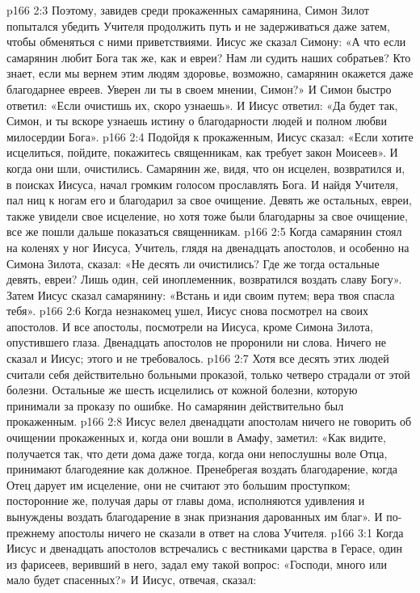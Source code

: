 \vs p166 2:3 Поэтому, завидев среди прокаженных самарянина, Симон Зилот попытался убедить Учителя продолжить путь и не задерживаться даже затем, чтобы обменяться с ними приветствиями. Иисус же сказал Симону: «А что если самарянин любит Бога так же, как и евреи? Нам ли судить наших собратьев? Кто знает, если мы вернем этим людям здоровье, возможно, самарянин окажется даже благодарнее евреев. Уверен ли ты в своем мнении, Симон?» И Симон быстро ответил: «Если очистишь их, скоро узнаешь». И Иисус ответил: «Да будет так, Симон, и ты вскоре узнаешь истину о благодарности людей и полном любви милосердии Бога».
\vs p166 2:4 Подойдя к прокаженным, Иисус сказал: «Если хотите исцелиться, пойдите, покажитесь священникам, как требует закон Моисеев». И когда они шли, очистились. Самарянин же, видя, что он исцелен, возвратился и, в поисках Иисуса, начал громким голосом прославлять Бога. И найдя Учителя, пал ниц к ногам его и благодарил за свое очищение. Девять же остальных, евреи, также увидели свое исцеление, но хотя тоже были благодарны за свое очищение, все же пошли дальше показаться священникам.
\vs p166 2:5 Когда самарянин стоял на коленях у ног Иисуса, Учитель, глядя на двенадцать апостолов, и особенно на Симона Зилота, сказал: «Не десять ли очистились? Где же тогда остальные девять, евреи? Лишь один, сей иноплеменник, возвратился воздать славу Богу». Затем Иисус сказал самарянину: «Встань и иди своим путем; вера твоя спасла тебя».
\vs p166 2:6 Когда незнакомец ушел, Иисус снова посмотрел на своих апостолов. И все апостолы, посмотрели на Иисуса, кроме Симона Зилота, опустившего глаза. Двенадцать апостолов не проронили ни слова. Ничего не сказал и Иисус; этого и не требовалось.
\vs p166 2:7 \pc Хотя все десять этих людей считали себя действительно больными проказой, только четверо страдали от этой болезни. Остальные же шесть исцелились от кожной болезни, которую принимали за проказу по ошибке. Но самарянин действительно был прокаженным.
\vs p166 2:8 \pc Иисус велел двенадцати апостолам ничего не говорить об очищении прокаженных и, когда они вошли в Амафу, заметил: «Как видите, получается так, что дети дома даже тогда, когда они непослушны воле Отца, принимают благодеяние как должное. Пренебрегая воздать благодарение, когда Отец дарует им исцеление, они не считают это большим проступком; посторонние же, получая дары от главы дома, исполняются удивления и вынуждены воздать благодарение в знак признания дарованных им благ». И по\hyp{}прежнему апостолы ничего не сказали в ответ на слова Учителя.
\vs p166 3:1 Когда Иисус и двенадцать апостолов встречались с вестниками царства в Герасе, один из фарисеев, веривший в него, задал ему такой вопрос: «Господи, много или мало будет спасенных?» И Иисус, отвечая, сказал:
